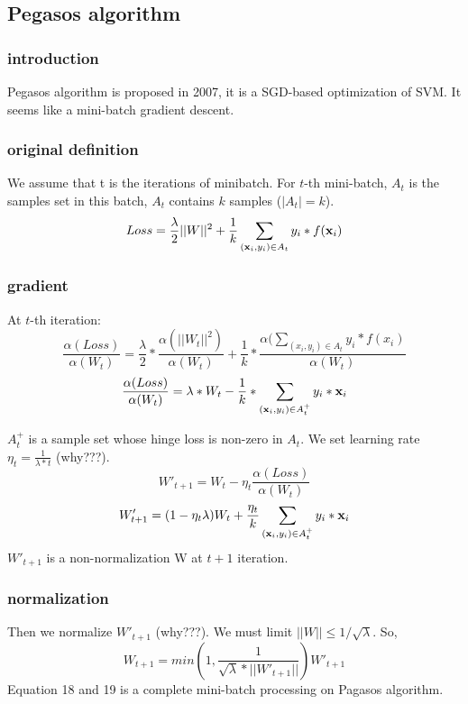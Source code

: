 \documentclass[11pt]{article}
\begin{document}
\subsection{Pegasos algorithm}
\subsubsection{introduction}
Pegasos algorithm is proposed in 2007, it is a SGD-based optimization of SVM. It seems like a mini-batch gradient descent.
\subsubsection{original definition}
We assume that t is the iterations of minibatch. For $t$-th mini-batch, $A_t$ is the samples set in this batch, $A_t$ contains $k$ samples ($|A_t| = k$).  
\begin{equation}
Loss = \frac{\lambda}{2} ||W||^2 + \frac{1}{k} \sum_{( \textbf x_i,y_i) \in A_t} y_i * f(\textbf x_i)
\end{equation}

\subsubsection{gradient}
At $t$-th iteration:
\begin{equation}
\frac{\alpha(Loss)}{\alpha(W_t)} = \frac{\lambda}{2} * \frac{\alpha( ||W_t||^2)}{\alpha(W_t)} + \frac{1}{k} * \frac{\alpha(\sum_{(x_i,y_i) \in A_t} y_i * f(x_i)}{\alpha(W_t)}
\end{equation}
\begin{equation}
\frac{\alpha(Loss)}{\alpha(W_t)} = \lambda * W_t - \frac{1}{k} * \sum_{(\textbf x_i,y_i)\in A^+_t} y_i * \textbf x_i
\end{equation}

$A^+_t$ is a sample set whose hinge loss is non-zero in $A_t$. We set learning rate $\eta_t = \frac{1}{\lambda * t}$ (why???). 
\begin{equation}
{W}'_{t+1} = W_t - \eta_t \frac{\alpha(Loss)}{\alpha(W_t)} 
\end{equation}
\begin{equation}
{W}'_{t+1} = (1 - \eta_t \lambda) W_t + \frac{\eta_t}{k} \sum_{(\textbf x_i,y_i)\in A^+_t} y_i * \textbf x_i
\end{equation}
${W}'_{t+1}$ is a non-normalization W at $t+1$ iteration.

\subsubsection{normalization}
Then we normalize ${W}'_{t+1}$ (why???). 
We must limit $||W|| \leq 1 / \sqrt{\lambda}$. So, 
\begin{equation}
W_{t+1} = min(1, \frac{1}{\sqrt{\lambda} * ||{W}'_{t+1}|| }) {W}'_{t+1}
\end{equation}
Equation 18 and 19 is a complete mini-batch processing on Pagasos algorithm.
\end{document}

